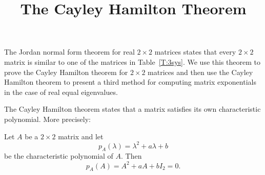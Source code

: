 \documentclass{ximera}
\title{The Cayley Hamilton Theorem}
\begin{document}
\begin{abstract}
\end{abstract}
\maketitle

\label{S:6.6}

The Jordan normal form theorem for real $2\times 2$ matrices states that 
every $2\times 2$ matrix is similar to one of the matrices in Table~\ref{T:3sys}.
We use this theorem to prove the Cayley Hamilton theorem 
 for $2\times 2$ 
matrices and then use the Cayley Hamilton theorem to present a third method 
for computing matrix exponentials in the case of real equal eigenvalues.


The Cayley Hamilton theorem states that a matrix satisfies its own
characteristic polynomial.  More precisely:
\begin{theorem} \label{T:CH2}
Let $A$ be a $2\times 2$ matrix and let
\[
p_A(\lambda) = \lambda^2 + a\lambda + b
\]
be the characteristic polynomial of $A$.  Then
\[
p_A(A) = A^2 + aA + bI_2 = 0.
\]
\end{theorem}
\end{document}

